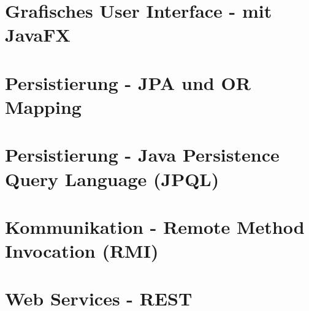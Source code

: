\documentclass[a4paper]{article}
\begin{document}
	\newpage
	\section{Grafisches User Interface - mit JavaFX}	
		
		
	\newpage
	\section{Persistierung - JPA und OR Mapping}
	
		
	\newpage
	\section{Persistierung - Java Persistence Query Language (JPQL)}
		
		
	\newpage
	\section{Kommunikation - Remote Method Invocation (RMI)}
	
	
	\newpage
	\section{Web Services - REST}
	
		
		
\end{document}
